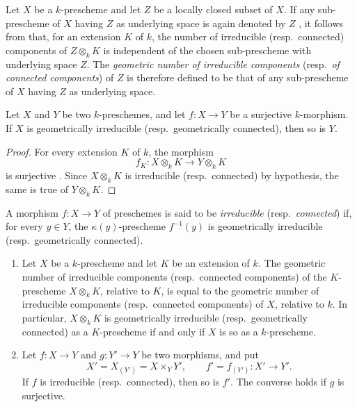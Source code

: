 \begin{env}[4.5.3]
\label{IV.4.5.3}
Let $X$ be a $k$-prescheme and let $Z$ be a locally closed subset of
$X$.
If any sub-prescheme of $X$ having $Z$ as underlying space is again
denoted by $Z$ , it follows from 
that, for an extension $K$ of $k$, the number of irreducible
(resp.\ connected) components of $Z\otimes_k K$ is independent of the
chosen sub-prescheme with underlying space $Z$.
The \emph{geometric number of irreducible components}
(resp.\ \emph{of connected components}) of $Z$ is therefore defined to
be that of any sub-prescheme of $X$ having $Z$ as underlying space.
\end{env}

\begin{proposition}[4.5.4]
\label{IV.4.5.4}
Let $X$ and $Y$ be two $k$-preschemes, and let $f:X\to Y$ be a
surjective $k$-morphism.
If $X$ is geometrically irreducible (resp.\ geometrically connected),
then so is $Y$.
\end{proposition}


\begin{proof}
For every extension $K$ of $k$, the morphism
\[
f_K:X\otimes_k K\longrightarrow Y\otimes_k K
\]
is surjective .
Since $X\otimes_k K$ is irreducible (resp.\ connected) by hypothesis,
the same is true of $Y\otimes_k K$.
\end{proof}

\begin{definition}[4.5.5]
\label{IV.4.5.5}
A morphism $f:X\to Y$ of preschemes is said to be
\emph{irreducible} (resp.\ \emph{connected}) if, for every $y\in Y$,
the $\kappa(y)$-prescheme $f^{-1}(y)$ is geometrically irreducible
(resp.\ geometrically connected).
\end{definition}

\begin{proposition}[4.5.6]
\label{IV.4.5.6}
\begin{enumerate}
\item[\rm(i)]
\label{IV.4.5.6.i}
Let $X$ be a $k$-prescheme and let $K$ be an extension of $k$.
The geometric number of irreducible components (resp.\ connected
components) of the $K$-prescheme $X\otimes_k K$, relative to $K$, is
equal to the geometric number of irreducible components
(resp.\ connected components) of $X$, relative to $k$.
In particular, $X\otimes_k K$ is geometrically irreducible
(resp.\ geometrically connected) as a $K$-prescheme if and only if
$X$ is so as a $k$-prescheme.

\item[\rm(ii)]
\label{IV.4.5.6.ii}
Let $f:X\to Y$ and $g:Y'\to Y$ be two morphisms, and put
\[
X'=X_{(Y')}=X\times_Y Y',
\qquad
f'=f_{(Y')}:X'\longrightarrow Y'.
\]
If $f$ is irreducible (resp.\ connected), then so is $f'$.
The converse holds if $g$ is surjective.
\end{enumerate}
\end{proposition}

